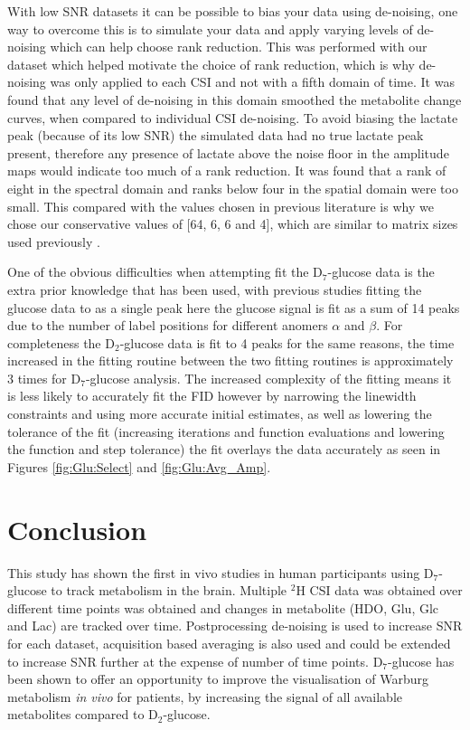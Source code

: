 \documentclass[class=article, crop=false]{standalone}
\begin{document}
With low SNR datasets it can be possible to bias your data using de-noising, one way to overcome this is to simulate your data and apply varying levels of de-noising which can help choose rank reduction. This was performed with our dataset which helped motivate the choice of rank reduction, which is why de-noising was only applied to each CSI and not with a fifth domain of time. It was found that any level of de-noising in this domain smoothed the metabolite change curves, when compared to individual CSI de-noising. To avoid biasing the lactate peak (because of its low SNR) the simulated data had no true lactate peak present, therefore any presence of lactate above the noise floor in the amplitude maps would indicate too much of a rank reduction. It was found that a rank of eight in the spectral domain and ranks below four in the spatial domain were too small. This compared with the values chosen in previous literature is why we chose our conservative values of [64, 6, 6 and 4], which are similar to matrix sizes used previously \cite{vonMorze2021ComparisonT, Kreis2020MeasuringMRI}. 

One of the obvious difficulties when attempting fit the D$_7$-glucose data is the extra prior knowledge that has been used, with previous studies fitting the glucose data to as a single peak here the glucose signal is fit as a sum of 14 peaks due to the number of label positions for different anomers $\alpha$ and $\beta$. For completeness the D$_2$-glucose data is fit to 4 peaks for the same reasons, the time increased in the fitting routine between the two fitting routines is approximately 3 times for D$_7$-glucose analysis. The increased complexity of the fitting means it is less likely to accurately fit the FID however by narrowing the linewidth constraints and using more accurate initial estimates, as well as lowering the tolerance of the fit (increasing iterations and function evaluations and lowering the function and step tolerance) the fit overlays the data accurately as seen in Figures \ref{fig:Glu:Select} and \ref{fig:Glu:Avg_Amp}. 

\section{Conclusion}

This study has shown the first in vivo studies in human participants using D$_7$-glucose to track metabolism in the brain. Multiple $^2$H CSI data was obtained over different time points was obtained and changes in metabolite (HDO, Glu, Glc and Lac) are tracked over time. Postprocessing de-noising is used to increase SNR for each dataset, acquisition based averaging is also used and could be extended to increase SNR further at the expense of number of time points. D$_7$-glucose has been shown to offer an opportunity to improve the visualisation of Warburg metabolism \textit{in vivo} for patients, by increasing the signal of all available metabolites compared to D$_2$-glucose. 

\end{document}
